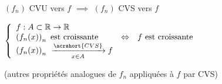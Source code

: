\documentclass[11pt,a4paper,fleqn,pdftex]{report}
\begin{document}
\begin{theorem}
     $(f_n)$ \gls{CVU} vers $f$ $\implies$ $(f_n)$ \gls{CVS} vers $f$
\end{theorem}
\begin{prop}
\begin{list}{-}{ }
\item $\left\lbrace
\begin{array}{l c l}
f:A\subset\mathbb{R}\to\mathbb{R}& & \\
\left(f_n(x)\right)_n\text{ est croissante}&\Leftrightarrow&f\text{ est croissante}\\
\left(f_n(x)\right)_n\ \xrightarrow[x\in{}A]{\acrshort{CVS}}f& & \\
\end{array}\right.$
\item (autres propriétés analogues de $f_n$ appliquées à $f$ par \acrshort{CVS})
\end{list}
\end{prop}
%
\end{document}
